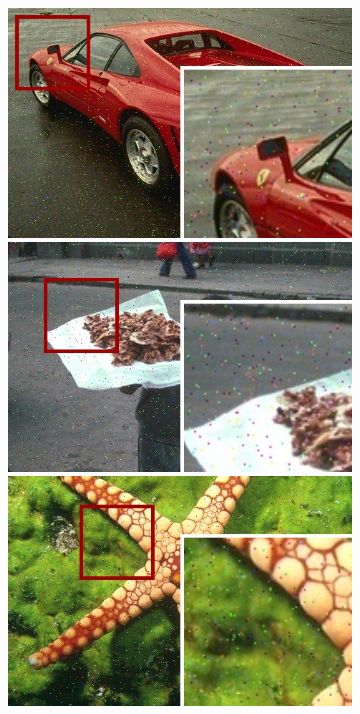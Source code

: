 \begin{figure}[!ht]
  \centering
  \begin{subfigure}[]{0.22\textwidth}
    \centering
    \includegraphics[width=\textwidth]{./figures/sensor/berkeley/29030_noisy_frame.jpg}\vspace{0.1cm}\\
    \includegraphics[width=\textwidth]{./figures/sensor/berkeley/90076_noisy_frame.jpg}\vspace{0.1cm}\\
    \includegraphics[width=\textwidth]{./figures/sensor/berkeley/12003_noisy_frame.jpg}\vspace{0.1cm}\\

\end{subfigure}
\end{figure}

